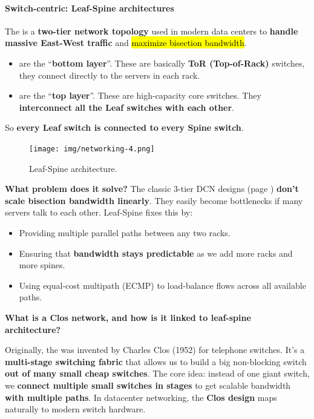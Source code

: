 \newpage

\paragraph{Switch-centric: Leaf-Spine architectures}

The  is a \textbf{two-tier network topology} used in modern data centers to \textbf{handle massive East-West traffic} and \hl{maximize bisection bandwidth}.
\begin{itemize}
    \item {} are the ``\textbf{bottom layer}''. These are basically \textbf{ToR (Top-of-Rack)} switches, they connect directly to the servers in each rack.
    \item {} are the ``\textbf{top layer}''. These are high-capacity core switches. They \textbf{interconnect all the Leaf switches with each other}.
\end{itemize}
So \textbf{every Leaf switch is connected to every Spine switch}.

\begin{figure}[!htp]
    \centering
    \texttt{[image: img/networking-4.png]}
    \caption{Leaf-Spine architecture.}
\end{figure}

\highspace
\textcolor{Green3}{ \textbf{What problem does it solve?}} The classic 3-tier DCN designs (page \pageref{paragraph: classical Three-Tier architecture}) \textbf{don't scale bisection bandwidth linearly}. They easily become bottlenecks if many servers talk to each other. Leaf-Spine fixes this by:
\begin{itemize}[label=\textcolor{Green3}{}]
    \item Providing multiple parallel paths between any two racks.
    \item Ensuring that \textbf{bandwidth stays predictable} as we add more racks and more spines.
    \item Using equal-cost multipath (ECMP) to load-balance flows across all available paths.
\end{itemize}

\highspace
\begin{flushleft}
    \textcolor{Green3}{ \textbf{What is a Clos network, and how is it linked to leaf-spine architecture?}}
\end{flushleft}
Originally, the  was invented by Charles Clos (1952) for telephone switches. It's a \textbf{multi-stage switching fabric} that allows us to build a big non-blocking switch \textbf{out of many small cheap switches}. The core idea: instead of one giant switch, we \textbf{connect multiple small switches in stages} to get scalable bandwidth \textbf{with multiple paths}. In datacenter networking, the \textbf{Clos design} maps naturally to modern switch hardware.

